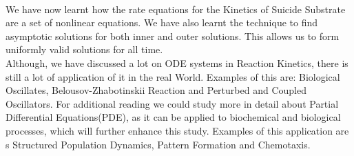 \documentclass[a4paper]{report}
\theoremstyle{definition}
\begin{document}
\\
We have now learnt how the rate equations for the Kinetics of Suicide Substrate are a set of nonlinear equations. We have also learnt the technique to find asymptotic solutions for both inner and outer solutions. This allows us to form uniformly valid solutions for all time.
\\
Although, we have discussed a lot on ODE systems in Reaction Kinetics, there is still a lot of application of it in the real World. Examples of this are: Biological Oscillates, Belousov-Zhabotinskii Reaction and Perturbed and Coupled Oscillators. For additional reading we could study more in detail about Partial Differential Equations(PDE), as it can be applied to biochemical and biological processes, which will further enhance this study. Examples of this application are s Structured Population Dynamics, Pattern Formation and Chemotaxis.
\end{document}
